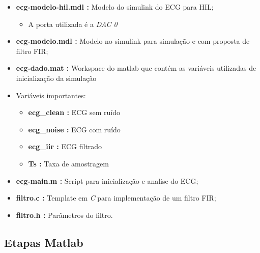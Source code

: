 \documentclass[11pt,a4paper]{scrartcl}
\begin{document}
\begin{itemize}
	\item \textbf{ecg-modelo-hil.mdl :} Modelo do simulink do ECG para HIL;
	
	\begin{itemize}
		\item  A porta utilizada é a \textit{DAC 0}
	\end{itemize}
	
 	\item \textbf{ecg-modelo.mdl :} Modelo no simulink para simulação e com proposta de filtro FIR;
	 
	\item \textbf{ecg-dado.mat :} Workspace do matlab que contém as variáveis utilizadas de inicialização da simulação
	
	\item Variáveis importantes:
	\begin{itemize}
		\item \textbf{ecg\_clean :} ECG sem ruído
		\item \textbf{ecg\_noise :} ECG com ruído
		\item \textbf{ecg\_iir :} 	ECG filtrado
		\item \textbf{Ts :}			Taxa de amostragem
	\end{itemize}
	
	\item \textbf{ecg-main.m :} Script para inicialização e analise do ECG; 
	
	\item \textbf{filtro.c :} Template em \textit{C} para implementação de um filtro FIR;
	\item\textbf{filtro.h :} Parâmetros do filtro.
	
\end{itemize}

\subsection{Etapas Matlab} \label{etapa:matlab}
\end{document}
